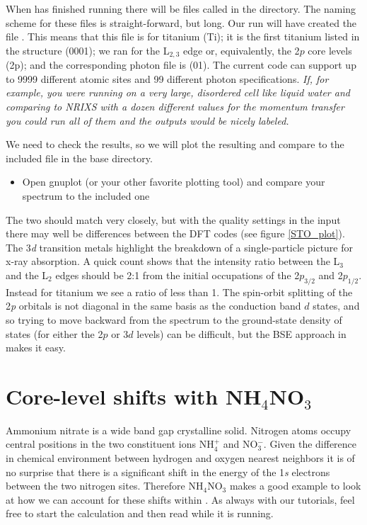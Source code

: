 \documentclass[11pt]{report}
\begin{document}
When  has finished running there will be files called  in the  directory. The naming scheme for these files is straight-forward, but long. Our run will have created the file . This means that this  file is for titanium (Ti); it is the first titanium listed in the structure (0001); we ran for the L$_{2,3}$ edge or, equivalently, the 2$p$ core levels (2p); and the corresponding photon file is  (01). The current  code can support up to 9999 different atomic sites and 99 different photon specifications. {\it If, for example, you were running on a very large, disordered cell like liquid water and comparing to NRIXS with a dozen different values for the momentum transfer you could run all of them and the outputs would be nicely labeled.}

We need to check the results, so we will plot the resulting  and compare to the included  file in the base  directory.
\begin{itemize}
\item Open gnuplot (or your other favorite plotting tool) and compare your spectrum to the included one
\end{itemize}
The two should match very closely, but with the quality settings in the input there may well be differences between the DFT codes (see figure \ref{STO_plot}). The 3{\it d} transition metals highlight the breakdown of a single-particle picture for x-ray absorption. A quick count shows that the intensity ratio between the L$_3$ and the L$_2$ edges should be 2:1 from the initial occupations of the 2$p_{3/2}$ and 2$p_{1/2}$. Instead for titanium we see a ratio of less than 1. The spin-orbit splitting of the 2{\it p} orbitals is not diagonal in the same basis as the conduction band $d$ states, and so trying to move backward from the spectrum to the ground-state density of states (for either the 2$p$ or 3$d$ levels) can be difficult, but the BSE approach in  makes it easy.

\section{Core-level shifts with NH$_4$NO$_3$}

Ammonium nitrate is a wide band gap crystalline solid. Nitrogen atoms occupy central positions in the two constituent ions NH$_4^+$ and NO$_3^-$. Given the difference in chemical environment between hydrogen and oxygen nearest neighbors it is of no surprise that there is a significant shift in the energy of the 1{\it s} electrons between the two nitrogen sites. Therefore NH$_4$NO$_3$ makes a good example to look at how we can account for these shifts within . As always with our tutorials, feel free to start the calculation  and then read while it is running.
\end{document}
